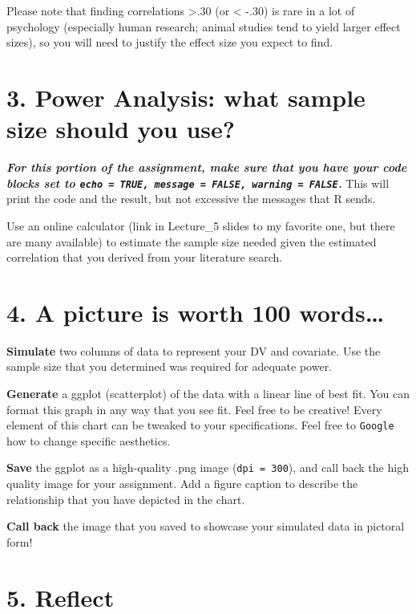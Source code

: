 \documentclass[
]{book}
\begin{document}
Please note that finding correlations \textgreater.30 (or \textless{} -.30) is rare in a lot of psychology (especially human research; animal studies tend to yield larger effect sizes), so you will need to justify the effect size you expect to find.

\section*{3. Power Analysis: what sample size should you use?}\label{power-analysis-what-sample-size-should-you-use}

\textbf{\emph{For this portion of the assignment, make sure that you have your code blocks set to \texttt{echo\ =\ TRUE,\ message\ =\ FALSE,\ warning\ =\ FALSE}.}} This will print the code and the result, but not excessive the messages that R sends.

Use an online calculator (link in Lecture\_5 slides to my favorite one, but there are many available) to estimate the sample size needed given the estimated correlation that you derived from your literature search.

\section*{4. A picture is worth 100 words\ldots{}}\label{a-picture-is-worth-100-words}

\textbf{Simulate} two columns of data to represent your DV and covariate. Use the sample size that you determined was required for adequate power.

\textbf{Generate} a ggplot (scatterplot) of the data with a linear line of best fit. You can format this graph in any way that you see fit. Feel free to be creative! Every element of this chart can be tweaked to your specifications. Feel free to \texttt{Google} how to change specific aesthetics.

\textbf{Save} the ggplot as a high-quality .png image (\texttt{dpi\ =\ 300}), and call back the high quality image for your assignment. Add a figure caption to describe the relationship that you have depicted in the chart.

\textbf{Call back} the image that you saved to showcase your simulated data in pictoral form!

\section*{5. Reflect}\label{reflect-3}
\end{document}

